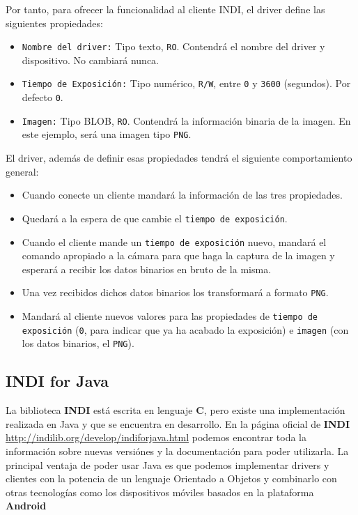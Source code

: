 \bigskip
Por tanto, para ofrecer la funcionalidad al cliente INDI, el driver define las siguientes propiedades:

\begin{itemize}
  \item \texttt{Nombre del driver:} Tipo texto, \texttt{RO}. Contendrá el nombre del driver y dispositivo. No cambiará nunca.
  \item \texttt{Tiempo de Exposición:} Tipo numérico, \texttt{R/W}, entre \texttt{0} y \texttt{3600} (segundos). Por defecto \texttt{0}.
  \item \texttt{Imagen:} Tipo BLOB, \texttt{RO}. Contendrá la información binaria de la imagen. En este ejemplo, será una imagen tipo \texttt{PNG}.
\end{itemize}

\bigskip
El driver, además de definir esas propiedades tendrá el siguiente comportamiento general:

\begin{itemize}
 \item Cuando conecte un cliente mandará la información de las tres propiedades.
 \item Quedará a la espera de que cambie el \texttt{tiempo de exposición}.
 \item Cuando el cliente mande un \texttt{tiempo de exposición} nuevo, mandará el comando apropiado a la cámara para que haga la captura de la imagen y esperará a recibir los datos binarios en bruto de la misma.
 \item Una vez recibidos dichos datos binarios los transformará a formato  \texttt{PNG}.
 \item Mandará al cliente nuevos valores para las propiedades de \texttt{tiempo de exposición} (\texttt{0}, para indicar que ya ha acabado la exposición) e \texttt{imagen} (con los datos binarios, el \texttt{PNG}).
\end{itemize}

\subsection{INDI for Java}

La biblioteca \textbf{INDI} está escrita en lenguaje \textbf{C}, pero existe una implementación realizada en Java y que se encuentra en desarrollo. En la página oficial de \textbf{INDI} \url{http://indilib.org/develop/indiforjava.html} podemos encontrar toda la información sobre nuevas versiónes y la documentación para poder utilizarla. La principal ventaja de poder usar Java es que podemos implementar drivers y clientes con la potencia de un lenguaje Orientado a Objetos y combinarlo con otras tecnologías como los dispositivos móviles basados en la plataforma \textbf{Android}


